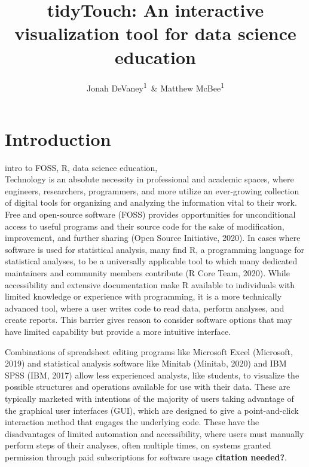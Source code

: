 \documentclass[english,man,floatsintext]{apa6}
\author{Jonah DeVaney\textsuperscript{1}\ \& Matthew McBee\textsuperscript{1}}
\affiliation{
\vspace{0.5cm}
\textsuperscript{1} East Tennesse State University}
\title{tidyTouch: An interactive visualization tool for data science education}
\date{}
\begin{document}
\maketitle

\hypertarget{introduction}{%
\section{Introduction}\label{introduction}}

intro to FOSS, R, data science education,\\
Technology is an absolute necessity in professional and academic spaces, where engineers, researchers, programmers, and more utilize an ever-growing collection of digital tools for organizing and analyzing the information vital to their work. Free and open-source software (FOSS) provides opportunities for unconditional access to useful programs and their source code for the sake of modification, improvement, and further sharing (Open Source Initiative, 2020). In cases where software is used for statistical analysis, many find R, a programming language for statistical analyses, to be a universally applicable tool to which many dedicated maintainers and community members contribute (R Core Team, 2020). While accessibility and extensive documentation make R available to individuals with limited knowledge or experience with programming, it is a more technically advanced tool, where a user writes code to read data, perform analyses, and create reports. This barrier gives reason to consider software options that may have limited capability but provide a more intuitive interface.

Combinations of spreadsheet editing programs like Microsoft Excel (Microsoft, 2019) and statistical analysis software like Minitab (Minitab, 2020) and IBM SPSS (IBM, 2017) allow less experienced analysts, like students, to visualize the possible structures and operations available for use with their data. These are typically marketed with intentions of the majority of users taking advantage of the graphical user interfaces (GUI), which are designed to give a point-and-click interaction method that engages the underlying code. These have the disadvantages of limited automation and accessibility, where users must manually perform steps of their analyses, often multiple times, on systems granted permission through paid subscriptions for software usage \textbf{citation needed?}.
\end{document}
